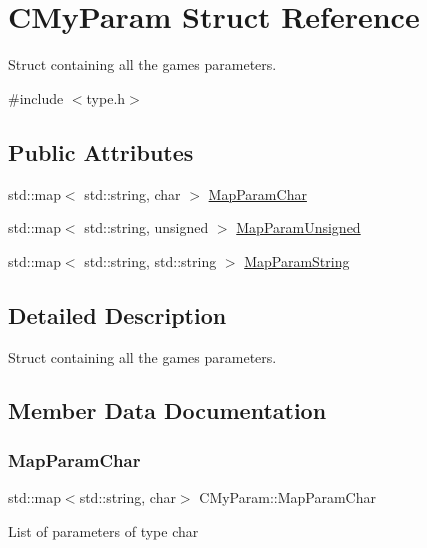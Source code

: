\hypertarget{struct_c_my_param}{}\section{C\+My\+Param Struct Reference}
\label{struct_c_my_param}


Struct containing all the game\textquotesingle{}s parameters.  




{\ttfamily \#include $<$type.\+h$>$}

\subsection*{Public Attributes}
\begin{DoxyCompactItemize}
\item 
std\+::map$<$ std\+::string, char $>$ \hyperlink{struct_c_my_param_ac38ede5a509bd268e749bc9c960466d3}{Map\+Param\+Char}
\item 
std\+::map$<$ std\+::string, unsigned $>$ \hyperlink{struct_c_my_param_aece7d4bdf4103e359f769d08e97a459d}{Map\+Param\+Unsigned}
\item 
std\+::map$<$ std\+::string, std\+::string $>$ \hyperlink{struct_c_my_param_a6f22660b5eff76608f47c52930e6ecf1}{Map\+Param\+String}
\end{DoxyCompactItemize}


\subsection{Detailed Description}
Struct containing all the game\textquotesingle{}s parameters. 

\subsection{Member Data Documentation}
\mbox{\label{struct_c_my_param_ac38ede5a509bd268e749bc9c960466d3}} 
\subsubsection{\texorpdfstring{Map\+Param\+Char}{MapParamChar}}
{\footnotesize\ttfamily std\+::map$<$std\+::string, char$>$ C\+My\+Param\+::\+Map\+Param\+Char}

List of parameters of type char \mbox{\label{struct_c_my_param_a6f22660b5eff76608f47c52930e6ecf1}} 
